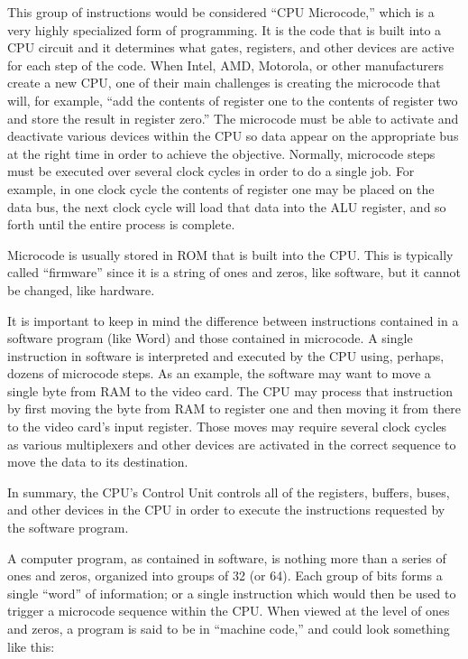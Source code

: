 This group of instructions would be considered ``CPU Microcode,'' which is a very highly specialized form of programming. It is the code that is built into a \ac{CPU} circuit and it determines what gates, registers, and other devices are active for each step of the code. When Intel, AMD, Motorola, or other manufacturers create a new \ac{CPU}, one of their main challenges is creating the microcode that will, for example, ``add the contents of register one to the contents of register two and store the result in register zero.'' The microcode must be able to activate and deactivate various devices within the \ac{CPU} so data appear on the appropriate bus at the right time in order to achieve the objective. Normally, microcode steps must be executed over several clock cycles in order to do a single job. For example, in one clock cycle the contents of register one may be placed on the data bus, the next clock cycle will load that data into the ALU register, and so forth until the entire process is complete.

Microcode is usually stored in \ac{ROM} that is built into the \ac{CPU}. This is typically called ``firmware'' since it is a string of ones and zeros, like software, but it cannot be changed, like hardware.

It is important to keep in mind the difference between instructions contained in a software program (like Word) and those contained in microcode. A single instruction in software is interpreted and executed by the \ac{CPU} using, perhaps, dozens of microcode steps. As an example, the software may want to move a single byte from \ac{RAM} to the video card. The \ac{CPU} may process that instruction by first moving the byte from \ac{RAM} to register one and then moving it from there to the video card's input register. Those moves may require several clock cycles as various multiplexers and other devices are activated in the correct sequence to move the data to its destination. 

In summary, the CPU's Control Unit controls all of the registers, buffers, buses, and other devices in the CPU in order to execute the instructions requested by the software program.

A computer program, as contained in software, is nothing more than a series of ones and zeros, organized into groups of 32 (or 64). Each group of bits forms a single ``word'' of information; or a single instruction which would then be used to trigger a microcode sequence within the \ac{CPU}. When viewed at the level of ones and zeros, a program is said to be in ``machine code,'' and could look something like this:

